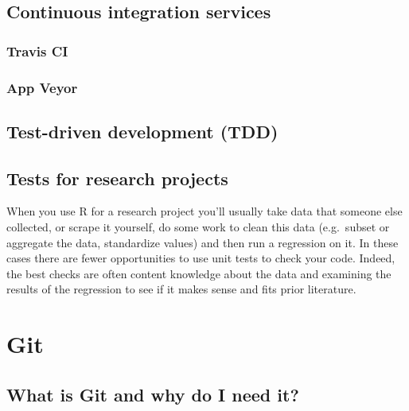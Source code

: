 \documentclass[
  12pt,
]{book}
\begin{document}
\hypertarget{continuous-integration-services}{%
\section{Continuous integration services}\label{continuous-integration-services}}

\hypertarget{travis-ci}{%
\subsection{Travis CI}\label{travis-ci}}

\hypertarget{app-veyor}{%
\subsection{App Veyor}\label{app-veyor}}

\hypertarget{test-driven-development-tdd}{%
\section{Test-driven development (TDD)}\label{test-driven-development-tdd}}

\hypertarget{tests-for-research-projects}{%
\section{Tests for research projects}\label{tests-for-research-projects}}

When you use R for a research project you'll usually take data that someone else collected, or scrape it yourself, do some work to clean this data (e.g.~subset or aggregate the data, standardize values) and then run a regression on it. In these cases there are fewer opportunities to use unit tests to check your code. Indeed, the best checks are often content knowledge about the data and examining the results of the regression to see if it makes sense and fits prior literature.

\hypertarget{git}{%
\chapter{Git}\label{git}}

\hypertarget{what-is-git-and-why-do-i-need-it}{%
\section{What is Git and why do I need it?}\label{what-is-git-and-why-do-i-need-it}}
\end{document}
